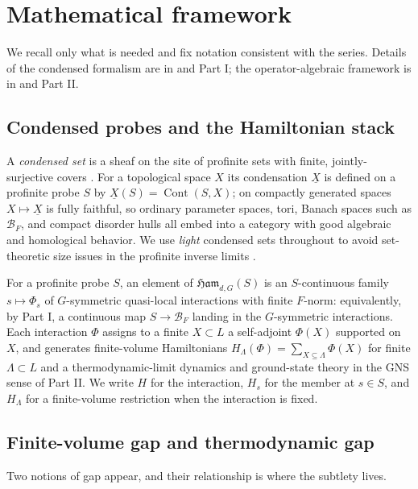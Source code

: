 \documentclass[12pt]{article}
\newcommand{\cond}[1]{\underline{#1}}          %
\newcommand{\Cont}{\operatorname{Cont}}        %
\newcommand{\Ffun}{F}                          %
\newcommand{\BF}{\mathcal{B}_{F}}              %
\newcommand{\Ham}{\mathfrak{Ham}}              %
\theoremstyle{plain}
\theoremstyle{definition}
\theoremstyle{remark}
\begin{document}
\section{Mathematical framework}
\label{sec:framework}

We recall only what is needed and fix notation consistent with the series. Details of
the condensed formalism are in \cite{clausen-scholze-condensed,barwick-haine-pyknotic}
and Part I; the operator-algebraic framework is in
\cite{ogata-classification-review} and Part II\@.

\subsection{Condensed probes and the Hamiltonian stack}
\label{sec:framework-condensed}

A \emph{condensed set} is a sheaf on the site of profinite sets with finite,
jointly-surjective covers \cite{clausen-scholze-condensed}. For a topological space
$X$ its condensation $\cond{X}$ is defined on a profinite probe $S$ by
$\cond{X}(S)=\Cont(S,X)$; on compactly generated spaces $X\mapsto\cond{X}$ is fully
faithful, so ordinary parameter spaces, tori, Banach spaces such as $\BF$, and
compact disorder hulls all embed into a category with good algebraic and homological
behavior. We use \emph{light} condensed sets throughout to avoid set-theoretic size
issues in the profinite inverse limits \cite{clausen-scholze-analytic-stacks}.

For a profinite probe $S$, an element of $\Ham_{d,G}(S)$ is an $S$-continuous family
$s\mapsto\Phi_s$ of $G$-symmetric quasi-local interactions with finite
$\Ffun$-norm: equivalently, by Part I, a continuous map $S\to\BF$ landing in the
$G$-symmetric interactions. Each interaction $\Phi$ assigns to a finite $X\subset L$
a self-adjoint $\Phi(X)$ supported on $X$, and generates finite-volume Hamiltonians
$H_\Lambda(\Phi)=\sum_{X\subseteq\Lambda}\Phi(X)$ for finite $\Lambda\subset L$ and a
thermodynamic-limit dynamics and ground-state theory in the GNS sense of Part II\@. We
write $H$ for the interaction, $H_s$ for the member at $s\in S$, and $H_\Lambda$ for
a finite-volume restriction when the interaction is fixed.

\subsection{Finite-volume gap and thermodynamic gap}
\label{sec:framework-gap}

Two notions of gap appear, and their relationship is where the subtlety lives.
\end{document}
